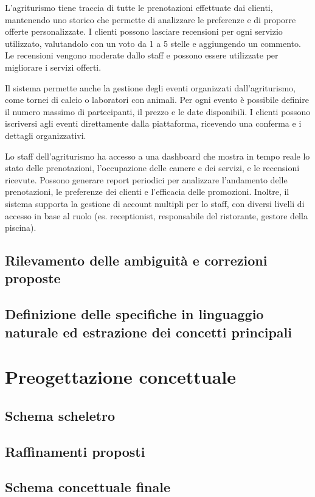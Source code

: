 \documentclass[a4paper,11pt]{report}
\begin{document}
L'agriturismo tiene traccia di tutte le prenotazioni effettuate dai clienti, mantenendo uno storico che permette di analizzare le preferenze e di
proporre offerte personalizzate. I clienti possono lasciare recensioni per ogni servizio utilizzato, valutandolo con un voto da 1 a 5
stelle e aggiungendo un commento. Le recensioni vengono moderate dallo staff e possono essere utilizzate per migliorare i servizi offerti.

Il sistema permette anche la gestione degli eventi organizzati dall'agriturismo, come tornei di calcio o laboratori con animali. Per ogni
evento è possibile definire il numero massimo di partecipanti, il prezzo e le date disponibili. I clienti possono iscriversi agli
eventi direttamente dalla piattaforma, ricevendo una conferma e i dettagli organizzativi.

Lo staff dell'agriturismo ha accesso a una dashboard che mostra in tempo reale lo stato delle prenotazioni, l'occupazione delle
camere e dei servizi, e le recensioni ricevute. Possono generare report periodici per analizzare l'andamento delle prenotazioni, le
preferenze dei clienti e l'efficacia delle promozioni. Inoltre, il sistema supporta la gestione di account multipli per lo staff, con
diversi livelli di accesso in base al ruolo (es. receptionist, responsabile del ristorante, gestore della piscina).

\section{Rilevamento delle ambiguità e correzioni proposte}

\section{Definizione delle specifiche in linguaggio naturale ed estrazione dei concetti principali}


\chapter{Preogettazione concettuale}
\section{Schema scheletro}
\section{Raffinamenti proposti}

\section{Schema concettuale finale}
\end{document}
